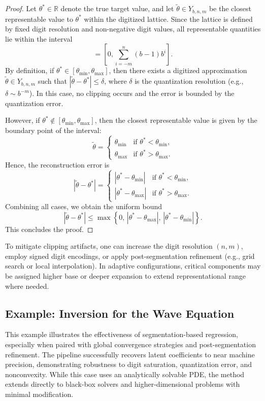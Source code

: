 \documentclass[aps,twocolumn,superscriptaddress,nofootinbib]{revtex4}
\begin{document}
\begin{proof}
Let \( \theta^* \in \mathbb{R} \) denote the true target value, and let \( \tilde{\theta} \in Y_{b,n,m} \) be the closest representable value to \( \theta^* \) within the digitized lattice. Since the lattice is defined by fixed digit resolution and non-negative digit values, all representable quantities lie within the interval
\begin{equation}
[\theta_{\min}, \theta_{\max}] = \left[ 0, \sum_{i=-m}^{n} (b-1) b^i \right].
\end{equation}
By definition, if \( \theta^* \in [\theta_{\min}, \theta_{\max}] \), then there exists a digitized approximation \( \tilde{\theta} \in Y_{b,n,m} \) such that \( |\tilde{\theta} - \theta^*| \leq \delta \), where \( \delta \) is the quantization resolution (e.g., \( \delta \sim b^{-m} \)). In this case, no clipping occurs and the error is bounded by the quantization error.

However, if \( \theta^* \notin [\theta_{\min}, \theta_{\max}] \), then the closest representable value is given by the boundary point of the interval:
\[
\tilde{\theta} = 
\begin{cases}
\theta_{\min} & \text{if } \theta^* < \theta_{\min}, \\
\theta_{\max} & \text{if } \theta^* > \theta_{\max}.
\end{cases}
\]
Hence, the reconstruction error is
\[
|\tilde{\theta} - \theta^*| = 
\begin{cases}
|\theta^* - \theta_{\min}| & \text{if } \theta^* < \theta_{\min}, \\
|\theta^* - \theta_{\max}| & \text{if } \theta^* > \theta_{\max}.
\end{cases}
\]
Combining all cases, we obtain the uniform bound
\begin{equation}
|\tilde{\theta} - \theta^*| \leq \max \left\{ 0,\, |\theta^* - \theta_{\max}|,\, |\theta^* - \theta_{\min}| \right\}.
\end{equation}
This concludes the proof.
\end{proof}


To mitigate clipping artifacts, one can increase the digit resolution \((n, m)\), employ signed digit encodings, or apply post-segmentation refinement (e.g., grid search or local interpolation). In adaptive configurations, critical components may be assigned higher base or deeper expansion to extend representational range where needed.

\subsection{Example: Inversion for the Wave Equation}\label{sec:toy_prob}
This example illustrates the effectiveness of segmentation-based regression, especially when paired with global convergence strategies and post-segmentation refinement. The pipeline successfully recovers latent coefficients to near machine precision, demonstrating robustness to digit saturation, quantization error, and nonconvexity. While this case uses an analytically solvable PDE, the method extends directly to black-box solvers and higher-dimensional problems with minimal modification. 
\end{document}
